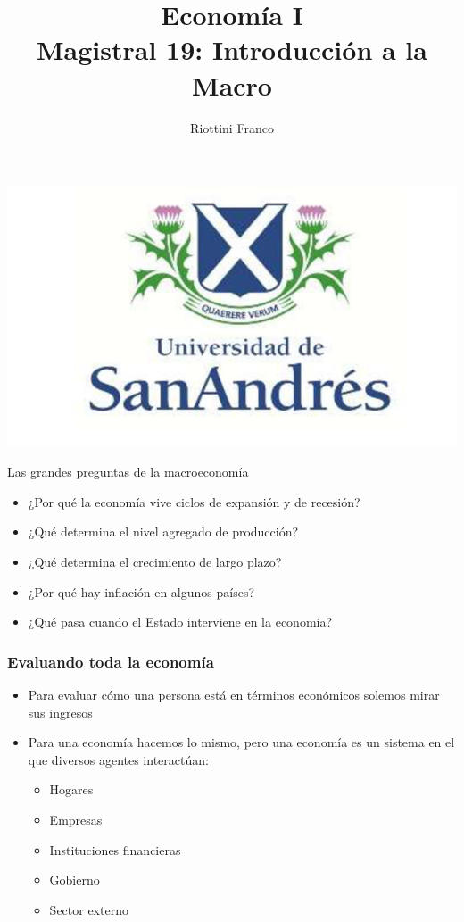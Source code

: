 \documentclass{beamer}
\title[Economía I]{Economía I \vspace{4mm}
\\ Magistral 19: Introducción a la Macro}
\date{}
\author[Franco Riottini]{Riottini Franco}
\institute[]{Universidad de San Andrés}
\begin{document}
\begin{frame}
\titlepage
\centering

\includegraphics[scale=0.2]{../Figures/logoUDESA.jpg} 
\end{frame}

\begin{frame}{Las grandes preguntas de la macroeconomía}
    \begin{itemize}
        \item ¿Por qué la economía vive ciclos de expansión y de recesión?
        \item ¿Qué determina el nivel agregado de producción?
        \item ¿Qué determina el crecimiento de largo plazo?
        \item ¿Por qué hay inflación en algunos países?
        \item ¿Qué pasa cuando el Estado interviene en la economía?
    \end{itemize} 
    
\end{frame}


\begin{frame}
\frametitle{Evaluando toda la economía}
\begin{itemize}
        \item Para evaluar cómo una persona está en términos económicos solemos mirar sus ingresos \vspace{1mm}
        \item Para una economía hacemos lo mismo, pero una economía es un sistema en el que diversos agentes interactúan: \vspace{1mm}
        \begin{itemize}
            \item Hogares
            \item Empresas
            \item Instituciones financieras
            \item Gobierno
            \item Sector externo
        \end{itemize}
\end{itemize}
\end{frame}
\end{document}
